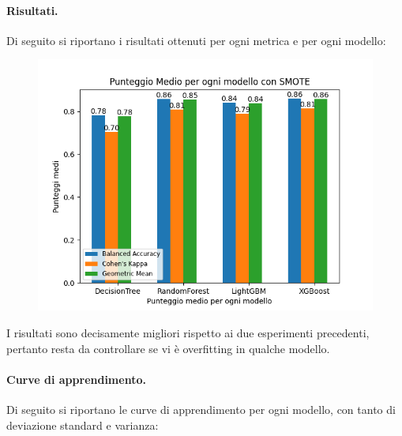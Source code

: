\paragraph{Risultati.} Di seguito si riportano i risultati ottenuti per ogni metrica e per ogni modello:

\begin{figure}[H]
    \centering
    \includegraphics[scale=0.7]{img/smote_metrics.png}
\end{figure}

\noindent I risultati sono decisamente migliori rispetto ai due esperimenti precedenti, pertanto resta da controllare se vi è overfitting in qualche modello.

\paragraph{Curve di apprendimento.} Di seguito si riportano le curve di apprendimento per ogni modello, con tanto di deviazione standard e varianza:

